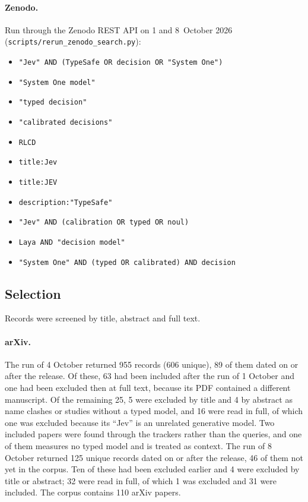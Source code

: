 \paragraph{Zenodo.}
Run through the Zenodo REST API on 1 and 8~October 2026 (\nolinkurl{scripts/rerun_zenodo_search.py}):
\begin{itemize}[nosep,leftmargin=1.5em]
  \item \nolinkurl{"Jev" AND (TypeSafe OR decision OR "System One")}
  \item \nolinkurl{"System One model"}
  \item \nolinkurl{"typed decision"}
  \item \nolinkurl{"calibrated decisions"}
  \item \nolinkurl{RLCD}
  \item \nolinkurl{title:Jev}
  \item \nolinkurl{title:JEV}
  \item \nolinkurl{description:"TypeSafe"}
  \item \nolinkurl{"Jev" AND (calibration OR typed OR noul)}
  \item \nolinkurl{Laya AND "decision model"}
  \item \nolinkurl{"System One" AND (typed OR calibrated) AND decision}
\end{itemize}

\subsection{Selection}\label{app:B2}

Records were screened by title, abstract and full text.

\paragraph{arXiv.} The run of 4 October returned 955 records (606 unique), 89 of them dated on or after the release. Of these, 63 had been included after the run of 1 October and one had been excluded then at full text, because its PDF contained a different manuscript. Of the remaining 25, 5 were excluded by title and 4 by abstract as name clashes or studies without a typed model, and 16 were read in full, of which one was excluded because its ``Jev'' is an unrelated generative model. Two included papers were found through the trackers rather than the queries, and one of them measures no typed model and is treated as context. The run of 8 October returned 125 unique records dated on or after the release, 46 of them not yet in the corpus. Ten of these had been excluded earlier and 4 were excluded by title or abstract; 32 were read in full, of which 1 was excluded and 31 were included. The corpus contains 110 arXiv papers.

